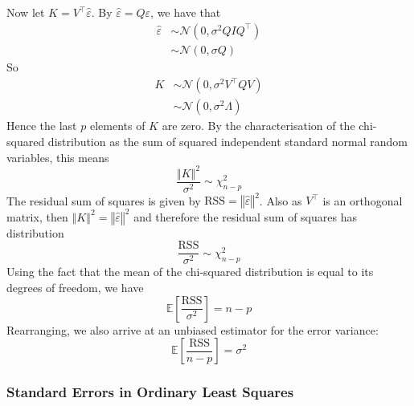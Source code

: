 \documentclass[11pt]{report} %
\begin{document}
Now let $K = V^{\top}\hat{\varepsilon}$. By $\hat{\varepsilon} = Q\varepsilon$, we have that
\begin{align}
\hat{\varepsilon} &\sim \mathcal{N}\left(0, \sigma^{2}QIQ^{\top}\right) \\
&\sim \mathcal{N}\left(0, \sigma Q\right)
\end{align}
So
\begin{align}
K &\sim \mathcal{N}\left(0, \sigma^{2}V^{\top}QV\right) \\
&\sim \mathcal{N}\left(0, \sigma^{2}\Lambda\right)
\end{align}
Hence the last $p$ elements of $K$ are zero. By the characterisation of the chi-squared distribution as the sum of squared independent standard normal random variables, this means
\begin{equation}
\dfrac{\left\Vert K\right\Vert^{2}}{\sigma^{2}} \sim \chi_{n - p}^{2}
\end{equation}
The residual sum of squares is given by $\mathrm{RSS} = \left\Vert \hat{\varepsilon} \right\Vert^{2}$. Also as $V^{\top}$ is an orthogonal matrix, then $\left\Vert K\right\Vert^{2} = \left\Vert \hat{\varepsilon} \right\Vert^{2}$ and therefore the residual sum of squares has distribution
\begin{equation}
\dfrac{\mathrm{RSS}}{\sigma^{2}} \sim \chi_{n - p}^{2}
\end{equation}
Using the fact that the mean of the chi-squared distribution is equal to its degrees of freedom, we have
\begin{equation}
\mathbb{E}\left[\dfrac{\mathrm{RSS}}{\sigma^{2}}\right] = n - p
\end{equation}
Rearranging, we also arrive at an unbiased estimator for the error variance:
\begin{equation}
\mathbb{E}\left[\dfrac{\mathrm{RSS}}{n - p}\right] = \sigma^{2}
\end{equation}

\subsubsection{Standard Errors in Ordinary Least Squares}
\end{document}

